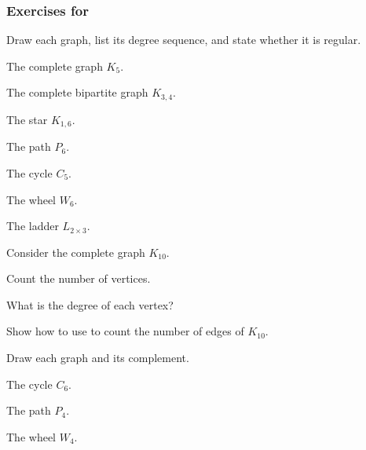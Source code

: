 
\subsubsection*{Exercises for  \substdgraphs}

\begin{exer}[\exerP] %
\label{exer_find_ds}
    Draw each graph, list its degree sequence, and state whether it is regular. 
        \begin{exerpart}
            \item The complete graph $K_5$.
            \item The complete bipartite graph $K_{3,4}$.
            \item The star $K_{1,6}$.
            \item The path $P_6$.
            \item The cycle $C_5$.
            \item The wheel $W_6$.
            \item The ladder $L_{2 \times 3}$.
        \end{exerpart}
\end{exer}

\begin{exer}[\exerP] %
\label{exer_K10}
    Consider the complete graph $K_{10}$.
    \begin{exerpart}
        \item Count the number of vertices.
        \item What is the degree of each vertex?
        \item Show how to use  to count the number of edges of $K_{10}$.
    \end{exerpart}
\end{exer}

\begin{exer}[\exerP] %
\label{exer_graph_comp_cycle_path_wheel}
    Draw each graph and its complement.  
        \begin{exerpart}          
            \item The cycle $C_6$.
            \item The path $P_4$.
            \item The wheel $W_4$.
        \end{exerpart}
\end{exer}


